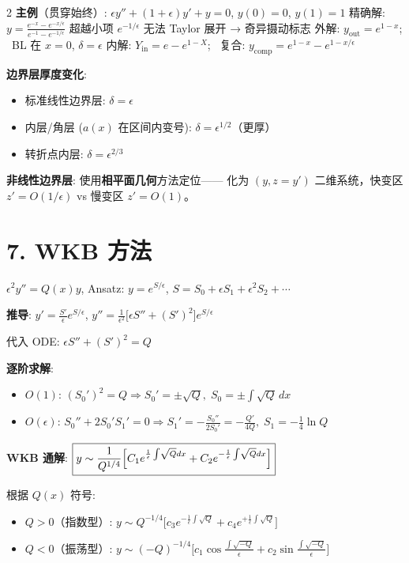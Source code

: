 \documentclass[10pt,a4paper]{article}
\newcommand{\eps}{\epsilon}
\begin{document}
\begin{multicols}{2}
\textbf{主例}（贯穿始终）:
$\eps y'' + (1+\eps)y' + y = 0$, $y(0)=0$, $y(1)=1$\;
精确解: $y = \frac{e^{-x} - e^{-x/\eps}}{e^{-1} - e^{-1/\eps}}$\;
超越小项 $e^{-1/\eps}$ 无法 Taylor 展开 → 奇异摄动标志\;
外解: $y_{\text{out}} = e^{1-x}$; \ BL 在 $x=0$, $\delta = \eps$\;
内解: $Y_{\text{in}} = e - e^{1-X}$; \ 复合: $y_{\text{comp}} = e^{1-x} - e^{1-x/\eps}$

\textbf{边界层厚度变化}:
\begin{itemize}
\item 标准线性边界层: $\delta = \eps$
\item 内层/角层 ($a(x)$ 在区间内变号): $\delta = \eps^{1/2}$（更厚）
\item 转折点内层: $\delta = \eps^{2/3}$
\end{itemize}

\textbf{非线性边界层}: 使用\textbf{相平面几何}方法定位——
化为 $(y,z=y')$ 二维系统，快变区 $z' = O(1/\eps)$ vs 慢变区 $z' = O(1)$。


\section{7. WKB 方法}

$\eps^2 y'' = Q(x) y$, \quad Ansatz: $y = e^{S/\eps}$,
$S = S_0 + \eps S_1 + \eps^2 S_2 + \cdots$

\textbf{推导}:
$y' = \frac{S'}{\eps}e^{S/\eps}$,
$y'' = \frac{1}{\eps^2}\bigl[\eps S'' + (S')^2\bigr]e^{S/\eps}$

代入 ODE: $\eps S'' + (S')^2 = Q$

\textbf{逐阶求解}:
\begin{itemize}
\item $O(1)$: $(S_0')^2 = Q \Rightarrow S_0' = \pm\sqrt{Q},\; S_0 = \pm\int\!\sqrt{Q}\,dx$
\item $O(\eps)$: $S_0'' + 2S_0'S_1' = 0 \Rightarrow
  S_1' = -\frac{S_0''}{2S_0'} = -\frac{Q'}{4Q},\;
  S_1 = -\frac{1}{4}\ln Q$
\end{itemize}

\textbf{WKB 通解}:
$\boxed{y \sim \frac{1}{Q^{1/4}}\Bigl[C_1 e^{\frac{1}{\eps}\int\!\sqrt{Q}dx} + C_2 e^{-\frac{1}{\eps}\int\!\sqrt{Q}dx}\Bigr]}$

根据 $Q(x)$ 符号:
\begin{itemize}
\item $Q > 0$（指数型）: $y \sim Q^{-1/4}\bigl[c_3 e^{-\frac{1}{\eps}\int\!\sqrt{Q}} + c_4 e^{+\frac{1}{\eps}\int\!\sqrt{Q}}\bigr]$
\item $Q < 0$（振荡型）: $y \sim (-Q)^{-1/4}\bigl[c_1\cos\frac{\int\!\sqrt{-Q}}{\eps} + c_2\sin\frac{\int\!\sqrt{-Q}}{\eps}\bigr]$
\end{itemize}


\end{multicols}
\end{document}
